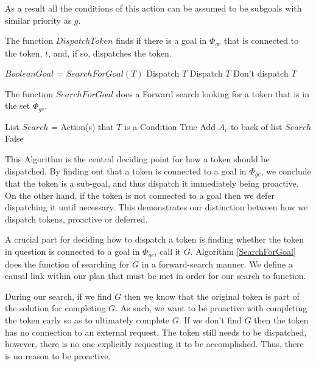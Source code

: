 As a result all the conditions of this action can be assumed to be
subgoals with similar priority as $g$.

\begin{algorithm} [H]
  \caption{\small The function $DispatchToken$ finds if there is a
    goal in $\Phi_{ge}$ that is connected to the token, $t$, and, if
    so, dispatches the token.}
\label{DispatchToken}
\begin{algorithmic}
\State $Boolean Goal$ = $SearchForGoal( T )$
	\State \Return Dispatch $T$
	\State \Return Dispatch $T$
\Else
	\State \Return Don't dispatch $T$
\EndIf
\EndFunction
\end{algorithmic}
\end{algorithm}

\begin{algorithm} [H]
  \caption{\small The function $SearchForGoal$ does a Forward search
    looking for a token that is in the set $\Phi_{ge}$.}
\label{SearchForGoal}
\begin{algorithmic}
\State List $Search$ = Action(s) that $T$ is a Condition 
			\State \Return True
			\State Add $A_c$ to back of list $Search$
		\EndIf
	\EndFor
\EndFor
\State \Return False
\EndFunction
\end{algorithmic}
\end{algorithm}

This Algorithm is the central deciding point for how a
token should be dispatched. By finding out that a token is connected
to a goal in $\Phi_{ge}$, we conclude that the token is a sub-goal,
and thus dispatch it immediately being proactive.  On the other hand,
if the token is not connected to a goal then we defer dispatching it
until necessary.  This demonstrates our distinction between how we
dispatch tokens, proactive or deferred.

A crucial part for deciding how to dispatch a token is finding whether
the token in question is connected to a goal in $\Phi_{ge}$, call it
$G$. Algorithm \ref{SearchForGoal} does the function of searching for
$G$ in a forward-search manner. We define a causal link within our
plan that must be met in order for our search to function.

During our search, if we find $G$ then we know that the original token
is part of the solution for completing $G$.  As such, we want to be
proactive with completing the token early so as to ultimately complete
$G$. If we don't find $G$ then the token has no connection to an
external request. The token still needs to be dispatched, however,
there is no one explicitly requesting it to be accomplished. Thus,
there is no reason to be proactive.

